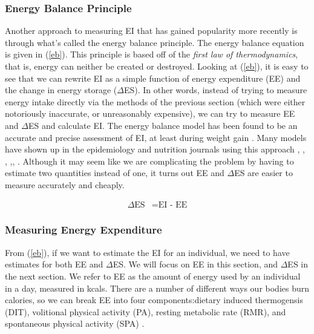 \documentclass[11pt]{article}\usepackage[]{graphicx}\usepackage[]{color}
\begin{document}
\subsubsection{Energy Balance Principle}

Another approach to measuring EI that has gained popularity more recently is through what's called the energy balance principle. The energy balance equation is given in (\ref{eb}). This principle is based off of the \emph{first law of thermodynamics}, that is,  energy can neither be created or destroyed. Looking at (\ref{eb}), it is easy to see that we can rewrite EI as a simple function of energy expenditure (EE) and the change in energy storage ($\Delta$ES). In other words, instead of trying to measure energy intake directly via the methods of the previous section (which were either notoriously inaccurate, or unreasonably expensive), we can try to measure EE and $\Delta$ES and calculate EI. The energy balance model has been found to be an accurate and precise assessment of EI, at least during weight gain \cite{gilmore}. Many models have shown up in the epidemiology and nutrition journals using this approach \cite{hall10}, \cite{thomas11a}, \cite{thomas10}, \cite{sanghvi15},\cite{hall11}, \cite{racette11}. Although it may seem like we are complicating the problem by having to estimate two quantities instead of one, it turns out EE and $\Delta$ES are easier to measure accurately and cheaply.




\begin{align}
  \Delta \text{ES} &= \text{EI - EE}
  \label{eb}
\end{align}

\subsubsection{Measuring Energy Expenditure}

From (\ref{eb}), if we want to estimate the EI for an individual, we need to have estimates for both EE and $\Delta$ES. We will focus on EE in this section, and $\Delta$ES in the next section. We refer to EE as the amount of energy used by an individual in a day, measured in kcals. There are a number of different ways our bodies burn calories, so we can break EE into four components:dietary induced thermogensis (DIT), volitional physical activity (PA), resting metabolic rate (RMR), and spontaneous physical activity (SPA) \cite{thomas11a}. 
\end{document}
